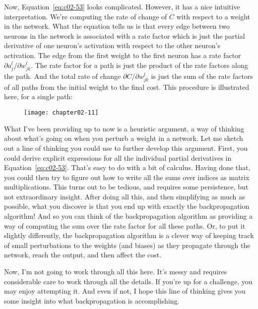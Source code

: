 Now, Equation~\ref{eq:c02-53} looks complicated. However, it has a nice intuitive interpretation. We're computing the rate of change of $C$ with respect to a weight in the network. What the equation tells us is that every edge between two neurons in the network is associated with a rate factor which is just the partial derivative of one neuron's activation with respect to the other neuron's activation. The edge from the first weight to the first neuron has a rate factor $\partial a_{j}^{l} / \partial w_{j k}^{l}$. The rate factor for a path is just the product of the rate factors along the path. And the total rate of change $\partial C / \partial w_{j k}^{l}$ is just the sum of the rate factors of all paths from the initial weight to the final cost. This procedure is illustrated here, for a single path: 

\begin{figure}
\texttt{[image: chapter02-11]}
\end{figure}

What I've been providing up to now is a heuristic argument, a way of thinking about what's going on when you perturb a weight in a network. Let me sketch out a line of thinking you could use to further develop this argument. First, you could derive explicit expressions for all the individual partial derivatives in Equation~\ref{eq:c02-53}. That's easy to do with a bit of calculus. Having done that, you could then try to figure out how to write all the sums over indices as matrix multiplications. This turns out to be tedious, and requires some persistence, but not extraordinary insight. After doing all this, and then simplifying as much as possible, what you discover is that you end up with exactly the backpropagation algorithm! And so you can think of the backpropagation algorithm as providing a way of computing the sum over the rate factor for all these paths. Or, to put it slightly differently, the backpropagation algorithm is a clever way of keeping track of small perturbations to the weights (and biases) as they propagate through the network, reach the output, and then affect the cost.

Now, I'm not going to work through all this here. It's messy and requires considerable care to work through all the details. If you're up for a challenge, you may enjoy attempting it. And even if not, I hope this line of thinking gives you some insight into what backpropagation is accomplishing.

